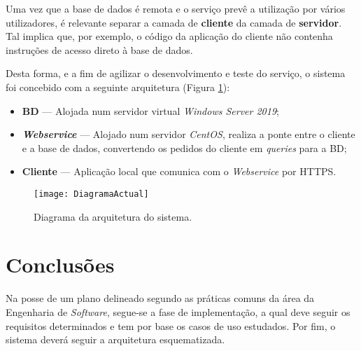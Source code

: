 Uma vez que a base de dados é remota e o serviço prevê a utilização por vários utilizadores, é relevante separar a camada de \textbf{cliente} da camada de \textbf{servidor}. Tal implica que, por exemplo, o código da aplicação do cliente não contenha instruções de acesso direto à base de dados.

Desta forma, e a fim de agilizar o desenvolvimento e teste do serviço, o sistema foi concebido com a seguinte arquitetura (Figura \ref{fig::diagrama-sistema}):
\begin{itemize}
    \item \textbf{\acl{BD}} --- Alojada num servidor virtual \textit{Windows Server 2019};
    \item \textbf{\itshape Webservice} --- Alojado num servidor \textit{CentOS}, realiza a ponte entre o cliente e a base de dados, convertendo os pedidos do cliente em \textit{queries} para a \ac{BD};
    \item \textbf{Cliente} --- Aplicação local que comunica com o \textit{Webservice} por \ac{HTTPS}.
\end{itemize}



\begin{figure}[!htbp]
    \centering
    \texttt{[image: DiagramaActual]}
    \caption[Diagrama da arquitetura do sistema]{Diagrama da arquitetura do sistema.}
    \label{fig::diagrama-sistema}
\end{figure}





\section{Conclusões}
\label{sec::engsoft:conclusao}

Na posse de um plano delineado segundo as práticas comuns da área da Engenharia de \textit{Software}, segue-se a fase de implementação, a qual deve seguir os requisitos determinados e tem por base os casos de uso estudados. Por fim, o sistema deverá seguir a arquitetura esquematizada.
